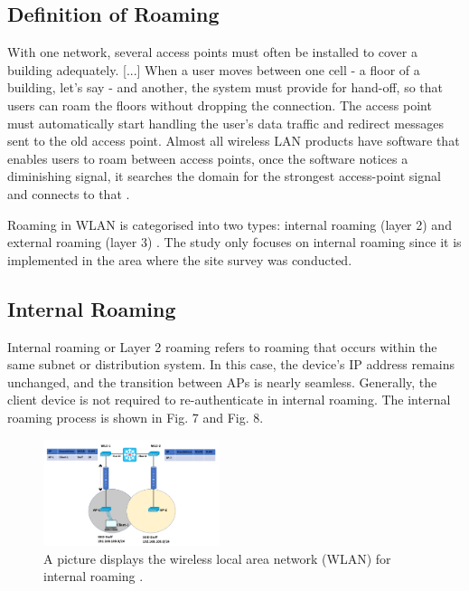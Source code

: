\documentclass[conference]{IEEEtran}
\begin{document}
\subsection{Definition of Roaming}

With one network, several access points must often be installed to cover a building adequately. [...] When a user moves between one cell - a floor of a building, let's say - and another, the system must provide for hand-off, so that users can roam the floors without dropping the connection. The access point must automatically start handling the user's data traffic and redirect messages sent to the old access point. Almost all wireless LAN products have software that enables users to roam between access points, once the software notices a diminishing signal, it searches the domain for the strongest access-point signal and connects to that \cite{wickelgren1996}.

Roaming in WLAN is categorised into two types: internal roaming (layer 2) and external roaming (layer 3) \cite{wiki_roaming}. The study only focuses on internal roaming since it is implemented in the area where the site survey was conducted.

\subsection{Internal Roaming}

Internal roaming or Layer 2 roaming  refers to roaming that occurs within the same subnet or distribution system. In this case, the device’s IP address remains unchanged, and the transition between APs is nearly seamless. Generally, the client device is not required to re-authenticate in internal roaming. The internal roaming process is shown in Fig. 7 and Fig. 8.

\begin{figure}[htbp]
    \centering
    \includegraphics[width=0.46\textwidth]{fig7_internal_roaming.png}
    \caption{A picture displays the wireless local area network (WLAN) for internal roaming \cite{study_ccnp}.}
\end{figure}
\end{document}
